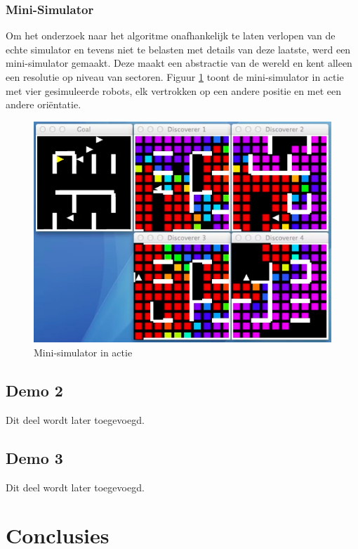 \documentclass[12pt,a4paper]{report}
\begin{document}
\subsection{Mini-Simulator}

Om het onderzoek naar het algoritme onafhankelijk te laten verlopen van de echte simulator en tevens niet te belasten met details van deze laatste, werd een mini-simulator gemaakt. Deze maakt een abstractie van de wereld en kent alleen een resolutie op niveau van sectoren. Figuur \ref{fig:mini-simulator} toont de mini-simulator in actie met vier gesimuleerde robots, elk vertrokken op een andere positie en met een andere ori\"entatie.

\begin{figure}[htbp]
  \centering
  \includegraphics[width=120mm]{resources/mini-simulator.png}
  \caption{Mini-simulator in actie}
  \label{fig:mini-simulator}
\end{figure}

\section{Demo 2}

Dit deel wordt later toegevoegd.

\section{Demo 3}

Dit deel wordt later toegevoegd.

\chapter{Conclusies}
\end{document}
